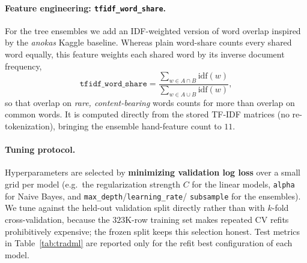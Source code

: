 \paragraph{Feature engineering: \texttt{tfidf\_word\_share}.}
For the tree ensembles we add an IDF-weighted version of word overlap inspired by
the \emph{anokas} Kaggle baseline. Whereas plain word-share counts every shared
word equally, this feature weights each shared word by its inverse document
frequency,
\[
  \texttt{tfidf\_word\_share}
  = \frac{\sum_{w \in A\cap B} \mathrm{idf}(w)}
         {\sum_{w \in A\cup B} \mathrm{idf}(w)},
\]
so that overlap on \emph{rare, content-bearing} words counts for more than
overlap on common words. It is computed directly from the stored TF-IDF matrices
(no re-tokenization), bringing the ensemble hand-feature count to $11$.

\paragraph{Tuning protocol.}
Hyperparameters are selected by \textbf{minimizing validation log loss} over a
small grid per model (e.g.\ the regularization strength $C$ for the linear models,
\texttt{alpha} for Naive Bayes, and \texttt{max\_depth}/\texttt{learning\_rate}/
\texttt{subsample} for the ensembles). We tune against the held-out validation
split directly rather than with $k$-fold cross-validation, because the
$323$K-row training set makes repeated CV refits prohibitively expensive; the
frozen split keeps this selection honest. Test metrics in Table~\ref{tab:tradml}
are reported only for the refit best configuration of each model.

